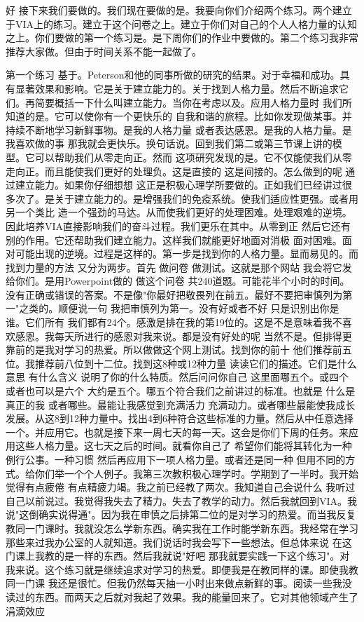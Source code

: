 好 接下来我们要做的。我们现在要做的是。我要向你们介绍两个练习。两个建立于VIA上的练习。建立于这个问卷之上。建立于你们对自己的个人人格力量的认知之上。你们要做的第一个练习是。是下周你们的作业中要做的。第二个练习我非常推荐大家做。但由于时间关系不能一起做了。 

第一个练习 基于。Peterson和他的同事所做的研究的结果。对于幸福和成功。具有显著效果和影响。它是关于建立能力的。关于找到人格力量。然后不断追求它们。再简要概括一下什么叫建立能力。当你在考虑以及。应用人格力量时 我们所知道的是。它可以使你有一个更快乐的 自我和谐的旅程。比如你发现做某事。并持续不断地学习新鲜事物。是我的人格力量 或者表达感恩。是我的人格力量。是我喜欢做的事 那我就会更快乐。换句话说。回到我们第二或第三节课上讲的模型。它可以帮助我们从零走向正。然而 这项研究发现的是。它不仅能使我们从零走向正。而且能使我们更好的处理负。这是直接的 这是间接的。怎么做到的呢 通过建立能力。如果你仔细想想 这正是积极心理学所要做的。正如我们已经讲过很多次了。是关于建立能力的。是增强我们的免疫系统。使我们适应性更强。或者用另一个类比 造一个强劲的马达。从而使我们更好的处理困难。处理艰难的逆境。因此培养VIA直接影响我们的奋斗过程。我们更乐在其中。从零到正 然后它还有别的作用。它还帮助我们建立能力。这样我们就能更好地面对消极 面对困难。面对可能出现的逆境。过程是这样的。第一步是找到你的人格力量。显而易见的。而找到力量的方法 又分为两步。首先 做问卷 做测试。这就是那个网站 我会将它发给你们。是用Powerpoint做的 做这个问卷 共240道题。可能花半个小时的时间。没有正确或错误的答案。不是像"你最好把敬畏列在前五。最好不要把审慎列为第一"之类的。顺便说一句 我把审慎列为第一。没有好或者不好 只是识别出你是谁。它们所有 我们都有24个。感激是排在我的第19位的。这是不是意味着我不喜欢感恩。我每天所进行的感恩对我来说。都是没有好处的呢 当然不是。但排得更靠前的是我对学习的热爱。所以做做这个网上测试。找到你的前十 他们推荐前五位。我推荐前八位到十二位。找到这8种或12种力量 读读它们的描述。它们是什么意思 有什么含义 说明了你的什么特质。然后问问你自己 这里面哪五个。或四个 或者也可以是六个 大约是五个。哪五个符合我们之前讲过的标准。也就是 什么是真正的我 或者哪些。最能让我感觉到充满活力 充满动力。或者哪些最能使我成长发展。从这8到12种力量中。找出4到6种符合这些标准的力量。然后从中任意选择一个。并应用它。也就是接下来一周七天的每一天。这会是你们下周的任务。来应用这些人格力量。这七天之后的时间。就看你自己了 希望你们能将其转化为一种例行公事。一种习惯 然后再应用下一项人格力量。或者还是同一种 但用不同的方式。给你们举一个个人例子。我第三次教积极心理学时。学期到了一半时。我开始觉得有点疲倦 有点精疲力竭。我之前已经教了两次。我知道自己会说什么 我听过自己以前说过。我觉得我失去了精力。失去了教学的动力。然后我就回到VIA。我说"这倒确实说得通"。因为我在审慎之后排第二位的是对学习的热爱。而当我反复教同一门课时。我就没怎么学新东西。确实我在工作时能学新东西。我经常在学习 那些来过我办公室的人就知道。我们说话时我会写下一些想法。但总体来说 在这门课上我教的是一样的东西。然后我就说"好吧 那我就要实践一下这个练习"。对我来说。这个练习就是继续追求对学习的热爱。即便我是在教同样的课。即使我教同一门课 我还是很忙。但我仍然每天抽一小时出来做点新鲜的事。阅读一些我没读过的东西。而两天之后就对我起了效果。我的能量回来了。它对其他领域产生了涓滴效应 